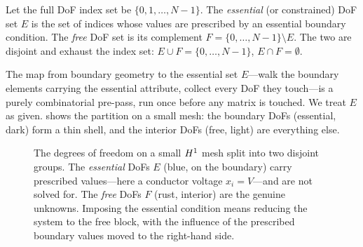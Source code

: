 \begin{definition}
\label{def:essdof}
Let the full DoF index set be $\{0,1,\dots,N-1\}$. The \emph{essential} (or
constrained) DoF set $E$ is the set of indices whose values are prescribed by an
essential boundary condition. The \emph{free} DoF set is its complement
$F = \{0,\dots,N-1\}\setminus E$. The two are disjoint and exhaust the index set:
$E\cup F = \{0,\dots,N-1\}$, $E\cap F=\emptyset$.
\end{definition}

The map from boundary geometry to the essential set $E$---walk the boundary
elements carrying the essential attribute, collect every DoF they touch---is a
purely combinatorial pre-pass, run once before any matrix is touched. We treat
$E$ as given.  shows the partition on a small mesh: the
boundary DoFs (essential, dark) form a thin shell, and the interior DoFs (free,
light) are everything else.

\begin{figure}[t]
\centering
{}
\caption[The free/essential DoF partition]{The degrees of freedom on a small
$H^1$ mesh split into two disjoint groups. The \emph{essential} DoFs $E$ (blue,
on the boundary) carry prescribed values---here a conductor voltage $x_i=V$---and
are not solved for. The \emph{free} DoFs $F$ (rust, interior) are the genuine
unknowns. Imposing the essential condition means reducing the system to the free
block, with the influence of the prescribed boundary values moved to the
right-hand side.}
\label{fig:partition}
\end{figure}

